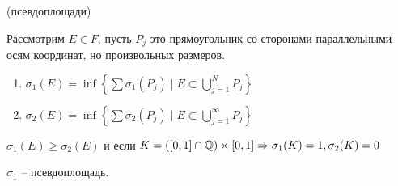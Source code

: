 \begin{example} (псевдоплощади)

    Рассмотрим $E \in F$, пусть $P_j$ это прямоугольник со сторонами параллельными осям координат, но произвольных размеров.
    \begin{enumerate}
        \item $\sigma_1(E) = \inf \left\{ \sum \sigma_1(P_j) \mid E \subset \bigcup\limits_{j=1}^N P_j \right\}$
        \item $\sigma_2(E) = \inf \left\{ \sum \sigma_2(P_j) \mid E \subset \bigcup\limits_{j=1}^\infty P_j \right\}$
    \end{enumerate}
    \begin{remark}
        $\sigma_1(E) \geqslant \sigma_2(E)$ и если $K = ([0, 1] \cap \mathbb{Q}) \times [0, 1] \Rightarrow \sigma_1(K) = 1, \sigma_2(K) = 0$
    \end{remark}
\end{example}

\begin{theorem}
    $\sigma_1$ -- псевдоплощадь. 
\end{theorem}

